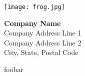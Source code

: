 \documentclass{article}
\begin{document}
\begin{figure*}[t]
    \centering
    \begin{minipage}[t]{0.3\textwidth}
        \vspace{0pt} %
        \texttt{[image: frog.jpg]}
    \end{minipage}
    \hfill
    \begin{minipage}[t]{0.6\textwidth}
        \vspace{0pt} %
        \raggedleft
        {\LARGE\textbf{Company Name}} \\
        \raggedleft
        Company Address Line 1 \\
        Company Address Line 2 \\
        City, State, Postal Code
    \end{minipage}
\end{figure*}


foobar

\end{document}
